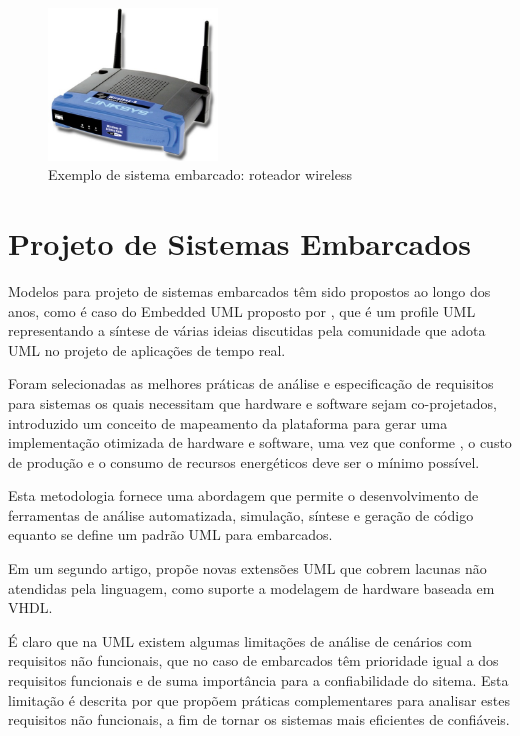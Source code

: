 \begin{figure}[h!]
			\centering
			\includegraphics[width=0.4\textwidth]{figures/embarcado_exemplo.jpg}
			\caption{Exemplo de sistema embarcado: roteador wireless}
			\label{fig:roteador}
	\end{figure}


\hfill

\section{Projeto de Sistemas Embarcados}

Modelos para projeto de sistemas embarcados têm sido propostos ao longo dos anos, como é caso do Embedded UML proposto por \textcite{Martin:2001}, que é um profile UML representando a síntese de várias ideias discutidas pela comunidade que adota UML no projeto de aplicações de tempo real. 

Foram selecionadas as melhores práticas de análise e especificação de requisitos para sistemas os quais necessitam que hardware e software sejam co-projetados, introduzido um conceito de mapeamento da plataforma para gerar uma implementação otimizada de hardware e software, uma vez que conforme \textcite{Wolf:2001}, o custo de produção e o consumo de recursos energéticos deve ser o mínimo possível.

Esta metodologia fornece uma abordagem que permite o desenvolvimento de ferramentas de análise automatizada, simulação, síntese e geração de código equanto se define um padrão UML para embarcados.

Em um segundo artigo, \textcite{Martin:2002} propõe novas extensões UML que cobrem lacunas não atendidas pela linguagem, como suporte a modelagem de hardware baseada em VHDL.

É claro que na UML existem algumas limitações de análise de cenários com requisitos não funcionais, que no caso de embarcados têm prioridade igual a dos requisitos funcionais e de suma importância para a confiabilidade do sitema. Esta limitação é descrita por \textcite{Espinoza:2008} que propõem práticas complementares para analisar estes requisitos não funcionais, a fim de tornar os sistemas mais eficientes de confiáveis.

